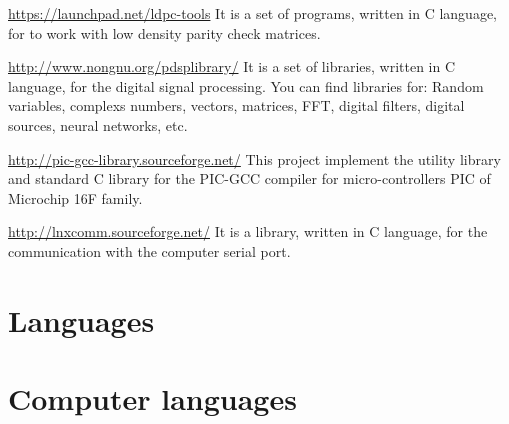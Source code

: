 \documentclass[11pt,a4paper,sans]{moderncv} %
\begin{document}
			{\url{https://launchpad.net/ldpc-tools}}
			{}{}
			{It is a set of programs, written in C language, for
			to work with low density parity check matrices.}
			

			{\url{http://www.nongnu.org/pdsplibrary/}}
			{}{}
			{It is a set of libraries, written in C language, for 
			the digital signal processing. You can find libraries for:
			Random variables, complexs numbers, vectors, matrices, FFT,
			digital filters, digital sources, neural networks, etc.}

			{\url{http://pic-gcc-library.sourceforge.net/}}
			{}{}
			{This project implement the utility library and 
			standard C library for the PIC-GCC compiler for 
			micro-controllers PIC of Microchip 16F family. }

			{\url{http://lnxcomm.sourceforge.net/}}
			{}{}
			{It is a library, written in C language, for the communication
			with the computer serial port.}


\section{Languages}


 

\section{Computer languages}

\end{document}
